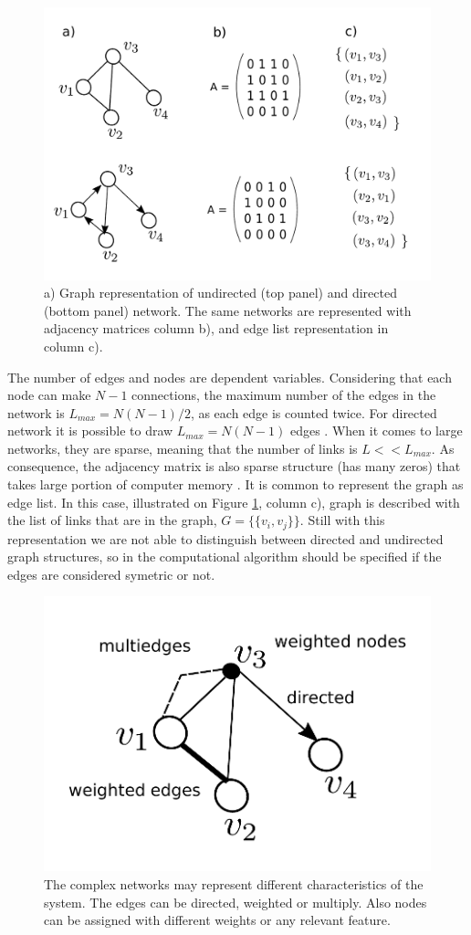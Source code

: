 \begin{figure}[h!]
\centering
\includegraphics[width=0.7\linewidth]{figures/methodology/directed_graph.pdf} 
\caption{a) Graph representation of undirected (top panel) and directed (bottom panel) network. The same networks are represented with adjacency matrices column b), and edge list representation in column c).}
\label{fig:graph_dir}
\end{figure}

The number of edges and nodes are dependent variables. Considering that each node can make $N-1$ connections, the maximum number of the edges in the network is $L_{max}=N(N-1)/2$, as each edge is counted twice. For directed network it is possible to draw $L_{max}=N(N-1)$ edges \cite{caldarelli2007scalefree}. When it comes to large networks, they are sparse, meaning that the number of links is $L<<L_{max}$. As consequence, the adjacency matrix is also sparse structure (has many zeros) that takes large portion of computer memory \cite{barabasi2016network}. 
It is common to represent the graph as edge list. In this case, illustrated on Figure \ref{fig:graph_dir}, column c), graph is described with the list of links that are in the graph, $G = \{ \{v_i,v_j\}\}$. Still with this representation we are not able to distinguish between directed and undirected graph structures, so in the computational algorithm should be specified if the edges are considered symetric or not.  

\begin{figure}[h!]
	\centering
	\includegraphics[width=0.4\linewidth]{figures/methodology/multi_graph.pdf} 
	\caption{The complex networks may represent different characteristics of the system. The edges can be directed, weighted or multiply. Also nodes can be assigned with different weights or any relevant feature.}
	\label{fig:multigraph}
\end{figure}

